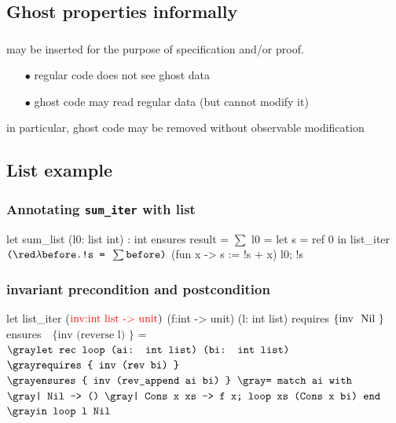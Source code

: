 \subsection*{Ghost properties informally}
\begin{frame}
\frametitle{}
	may be inserted for the purpose of specification and/or proof.
	\begin{itemize}
	\item[\red $\bullet$] regular code does not see ghost data
	\item[\red $\bullet$] ghost code may read regular data (but cannot modify it)
	\end{itemize}
in particular, ghost code may be removed without observable modification


\end{frame}

\subsection*{List example} 
\begin{frame}[fragile]
\frametitle{Annotating \texttt{sum\_iter} with list}
\begin{footnotesize}
\begin{whycode}
  let sum_list (l0: list int) : int
    ensures { result = $\sum$ l0 }
  = let s = ref 0 in
    list_iter $\texttt{(}{\red \lambda \texttt{before.!s = } \sum \texttt{before)}}$ (fun x -> s := !s + x) l0; 
    !s     
\end{whycode}
\end{footnotesize}
\end{frame}


\begin{frame}[fragile]
\frametitle{invariant precondition and postcondition}
\begin{footnotesize}
\begin{whycode}
let list_iter ($\textcolor{red}{\text{inv:int list -> unit}})$ 
    (f:int -> unit) (l: int list)
     requires  $\text{\{\text{inv } Nil \}}$
     ensures $\text{~~}\{ \text{inv (reverse l)
     	 }\}$    
 = ${\gray\texttt{let rec loop (ai: int list) (bi: int list)}}$
      ${\gray\texttt{requires \{ inv (rev bi) \} }}$
      ${\gray\texttt{ensures  \{ inv (rev\_append ai bi) \}}}$  
    ${\gray\texttt{= match ai with}}$
       ${\gray\texttt{| Nil       -> ()}}$
       ${\gray\texttt{| Cons x xs -> f x; loop xs (Cons x bi) end}}$
   ${\gray\texttt{in loop l Nil}}$
\end{whycode}
\end{footnotesize}
\end{frame}
\addtocounter{framenumber}{-1}


